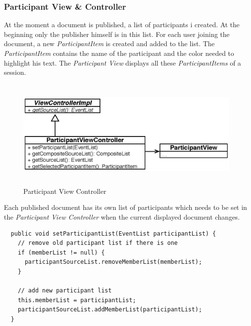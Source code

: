\subsubsection{Participant View \& Controller}
At the moment a document is published, a list of participants i created. At the beginning only the publisher himself is in this list.  For each user joining the document, a new \textit{ParticipantItem} is created and added to the list. The \textit{ParticipantItem} contains the name of the participant and the color needed to highlight his text. The \textit{Participant View} displays all these \textit{ParticipantItems} of a session.
\begin{figure}[H]
\begin{center}
  \includegraphics[height=2.15in, width=5.62in]{../images/finalreport/application_participantview.eps}
\caption{Participant View Controller}
\label{application_participantview}
\end{center}
\end{figure}
Each published document has its own list of participants which needs to be set in the \textit{Participant View Controller} when the current displayed document changes.
\begin{verbatim}
  public void setParticipantList(EventList participantList) {
    // remove old participant list if there is one
    if (memberList != null) {
      participantSourceList.removeMemberList(memberList);
    }

    // add new participant list    
    this.memberList = participantList;
    participantSourceList.addMemberList(participantList);
  }
\end{verbatim}

